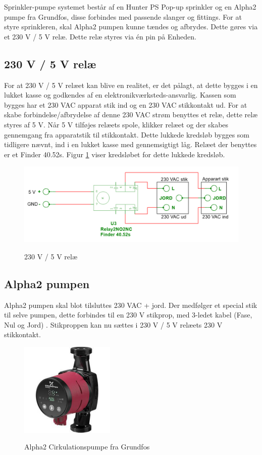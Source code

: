 Sprinkler-pumpe systemet består af en Hunter PS Pop-up sprinkler og en Alpha2 pumpe fra Grundfos, disse forbindes med passende slanger og fittings. For at styre sprinkleren, skal Alpha2 pumpen kunne tændes og afbrydes. Dette gøres via et 230 V / 5 V relæ. Dette relæ styres via én pin på Enheden. 


\subsection{230 V / 5 V relæ}

For at 230 V / 5 V relæet kan blive en realitet, er det pålagt, at dette bygges i en lukket kasse og godkendes af en elektronikværksteds-ansvarlig. Kassen som bygges har et 230 VAC apparat stik ind og en 230 VAC stikkontakt ud. For at skabe forbindelse/afbrydelse af denne 230 VAC strøm benyttes et relæ, dette relæ styres af 5 V. Når 5 V  tilføjes relæets spole, klikker relæet og der skabes gennemgang fra apparatstik til stikkontakt. Dette lukkede kredsløb bygges som tidligere nævnt, ind i en lukket kasse med gennemsigtigt låg. Relæet der benyttes er et Finder 40.52s. Figur \ref{lab:RELAY} viser kredsløbet for dette lukkede kredsløb.

\begin{figure}[H] \centering
{\includegraphics[width=\textwidth]{filer/design/Billeder/230VAC_KREDS}}
\caption{230 V / 5 V relæ}
\label{lab:RELAY}
\raggedright
\end{figure}

\subsection{Alpha2 pumpen}

Alpha2 pumpen skal blot tilsluttes 230 VAC + jord. Der medfølger et special stik til selve pumpen, dette forbindes til en 230 V stikprop, med 3-ledet kabel (Fase, Nul og Jord) . Stikproppen kan nu sættes i 230 V / 5 V relæets 230 V stikkontakt.

\begin{figure}[H] \centering
{\includegraphics[width=0.4\textwidth]{filer/design/Billeder/Alpha2}}
\caption{Alpha2 Cirkulationspumpe fra Grundfos}
\label{lab:Alpha2}
\raggedright
\end{figure} 

